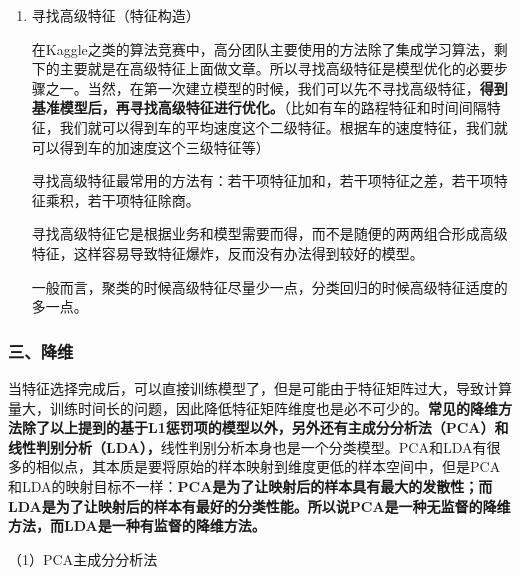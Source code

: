 \documentclass[
]{article}
\begin{document}
\begin{enumerate}
\def\labelenumi{\arabic{enumi}.}
\item
  寻找高级特征（特征构造）

  在Kaggle之类的算法竞赛中，高分团队主要使用的方法除了集成学习算法，剩下的主要就是在高级特征上面做文章。所以寻找高级特征是模型优化的必要步骤之一。当然，在第一次建立模型的时候，我们可以先不寻找高级特征，\textbf{得到基准模型后，再寻找高级特征进行优化。}（比如有车的路程特征和时间间隔特征，我们就可以得到车的平均速度这个二级特征。根据车的速度特征，我们就可以得到车的加速度这个三级特征等）

  寻找高级特征最常用的方法有：若干项特征加和，若干项特征之差，若干项特征乘积，若干项特征除商。

  寻找高级特征它是根据业务和模型需要而得，而不是随便的两两组合形成高级特征，这样容易导致特征爆炸，反而没有办法得到较好的模型。

  一般而言，聚类的时候高级特征尽量少一点，分类回归的时候高级特征适度的多一点。
\end{enumerate}

\subsubsection{三、降维}\label{ux4e09ux964dux7ef4}

当特征选择完成后，可以直接训练模型了，但是可能由于特征矩阵过大，导致计算量大，训练时间长的问题，因此降低特征矩阵维度也是必不可少的。\textbf{常见的降维方法除了以上提到的基于L1惩罚项的模型以外，另外还有主成分分析法（PCA）和线性判别分析（LDA），}线性判别分析本身也是一个分类模型。PCA和LDA有很多的相似点，其本质是要将原始的样本映射到维度更低的样本空间中，但是PCA和LDA的映射目标不一样：\textbf{PCA是为了让映射后的样本具有最大的发散性；而LDA是为了让映射后的样本有最好的分类性能。所以说PCA是一种无监督的降维方法，而LDA是一种有监督的降维方法。}

（1）PCA主成分分析法
\end{document}
